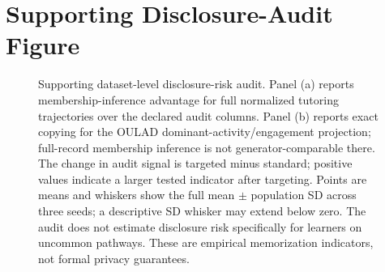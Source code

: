 \documentclass[10pt]{article}
\begin{document}
\section{Supporting Disclosure-Audit Figure}
\begin{figure}[!htbp]
\centering
\resizebox{\linewidth}{!}{}
\caption{Supporting dataset-level disclosure-risk audit. Panel (a) reports membership-inference advantage for full normalized tutoring trajectories over the declared audit columns. Panel (b) reports exact copying for the OULAD dominant-activity/engagement projection; full-record membership inference is not generator-comparable there. The change in audit signal is targeted minus standard; positive values indicate a larger tested indicator after targeting. Points are means and whiskers show the full mean $\pm$ population SD across three seeds; a descriptive SD whisker may extend below zero. The audit does not estimate disclosure risk specifically for learners on uncommon pathways. These are empirical memorization indicators, not formal privacy guarantees.}
\label{fig:rq2-disclosure-risk}
\end{figure}

\ifdefined\embeddedappendix
\else


\end{document}
